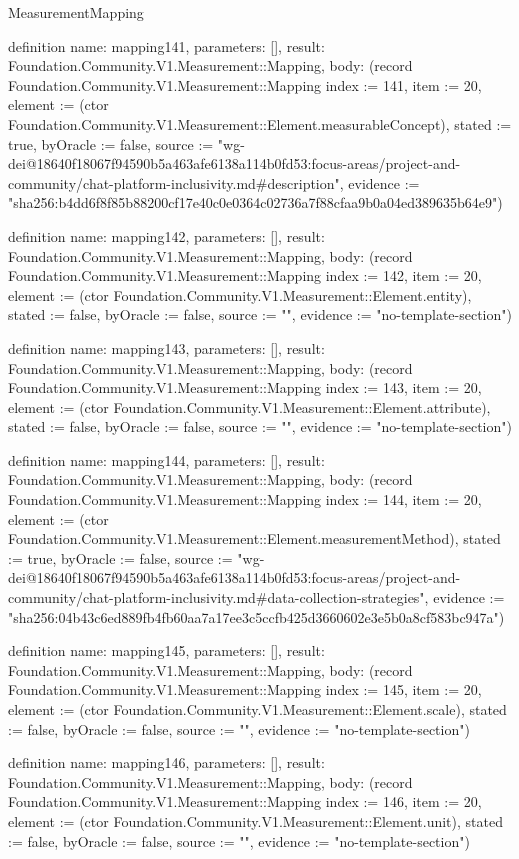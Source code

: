 \begin{lexlean}{MeasurementMapping}
\begin{semanticmodule}
definition{
  name: mapping141,
  parameters: [],
  result: Foundation.Community.V1.Measurement::Mapping,
  body: (record Foundation.Community.V1.Measurement::Mapping {index := 141, item := 20, element := (ctor Foundation.Community.V1.Measurement::Element.measurableConcept), stated := true, byOracle := false, source := "wg-dei@18640f18067f94590b5a463afe6138a114b0fd53:focus-areas/project-and-community/chat-platform-inclusivity.md#description", evidence := "sha256:b4dd6f8f85b88200cf17e40c0e0364c02736a7f88cfaa9b0a04ed389635b64e9"})
}

definition{
  name: mapping142,
  parameters: [],
  result: Foundation.Community.V1.Measurement::Mapping,
  body: (record Foundation.Community.V1.Measurement::Mapping {index := 142, item := 20, element := (ctor Foundation.Community.V1.Measurement::Element.entity), stated := false, byOracle := false, source := "", evidence := "no-template-section"})
}

definition{
  name: mapping143,
  parameters: [],
  result: Foundation.Community.V1.Measurement::Mapping,
  body: (record Foundation.Community.V1.Measurement::Mapping {index := 143, item := 20, element := (ctor Foundation.Community.V1.Measurement::Element.attribute), stated := false, byOracle := false, source := "", evidence := "no-template-section"})
}

definition{
  name: mapping144,
  parameters: [],
  result: Foundation.Community.V1.Measurement::Mapping,
  body: (record Foundation.Community.V1.Measurement::Mapping {index := 144, item := 20, element := (ctor Foundation.Community.V1.Measurement::Element.measurementMethod), stated := true, byOracle := false, source := "wg-dei@18640f18067f94590b5a463afe6138a114b0fd53:focus-areas/project-and-community/chat-platform-inclusivity.md#data-collection-strategies", evidence := "sha256:04b43c6ed889fb4fb60aa7a17ee3c5ccfb425d3660602e3e5b0a8cf583bc947a"})
}

definition{
  name: mapping145,
  parameters: [],
  result: Foundation.Community.V1.Measurement::Mapping,
  body: (record Foundation.Community.V1.Measurement::Mapping {index := 145, item := 20, element := (ctor Foundation.Community.V1.Measurement::Element.scale), stated := false, byOracle := false, source := "", evidence := "no-template-section"})
}

definition{
  name: mapping146,
  parameters: [],
  result: Foundation.Community.V1.Measurement::Mapping,
  body: (record Foundation.Community.V1.Measurement::Mapping {index := 146, item := 20, element := (ctor Foundation.Community.V1.Measurement::Element.unit), stated := false, byOracle := false, source := "", evidence := "no-template-section"})
}


\end{semanticmodule}
\end{lexlean}
